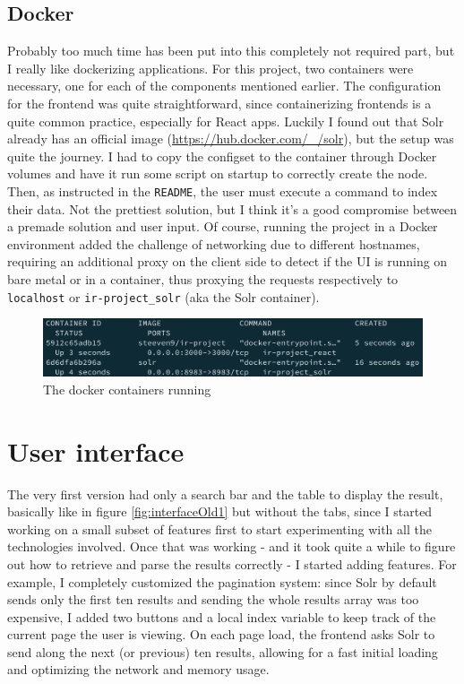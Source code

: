 \documentclass[12pt]{article}
\begin{document}
	\newpage
	
	\subsection{Docker}
	
		Probably too much time has been put into this completely not required part, but I really like dockerizing applications. For this project, two containers were necessary, one for each of the components mentioned earlier. The configuration for the frontend was quite straightforward, since containerizing frontends is a quite common practice, especially for React apps. Luckily I found out that Solr already has an official image (\url{https://hub.docker.com/_/solr}), but the setup was quite the journey. I had to copy the configset to the container through Docker volumes and have it run some script on startup to correctly create the node. Then, as instructed in the \texttt{README}, the user must execute a command to index their data. Not the prettiest solution, but I think it's a good compromise between a premade solution and user input. Of course, running the project in a Docker environment added the challenge of networking due to different hostnames, requiring an additional proxy on the client side to detect if the UI is running on bare metal or in a container, thus proxying the requests respectively to \texttt{localhost} or \texttt{ir-project\_solr} (aka the Solr container).
		
		\begin{figure}[H]
			\centering
			\includegraphics[width=\textwidth]{img/docker.png}
			\caption{The docker containers running}
			\label{img:docker}
		\end{figure}
	
	\newpage
	
	
\section{User interface}\label{sec:UI}

	The very first version had only a search bar and the table to display the result, basically like in figure \ref{fig:interfaceOld1} but without the tabs, since I started working on a small subset of features first to start experimenting with all the technologies involved. Once that was working - and it took quite a while to figure out how to retrieve and parse the results correctly - I started adding features. For example, I completely customized the pagination system: since Solr by default sends only the first ten results and sending the whole results array was too expensive, I added two buttons and a local index variable to keep track of the current page the user is viewing. On each page load, the frontend asks Solr to send along the next (or previous) ten results, allowing for a fast initial loading and optimizing the network and memory usage.\\
	
\end{document}
